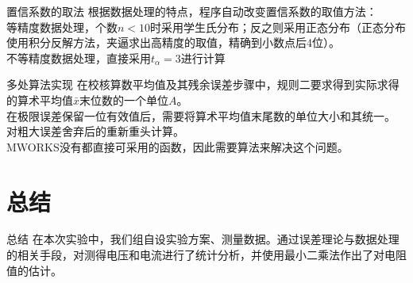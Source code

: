\documentclass{beamer}
\begin{document}
	\begin{frame}
		\begin{block}{置信系数的取法}
			根据数据处理的特点，程序自动改变置信系数的取值方法：\\
			等精度数据处理，个数$n<10$时采用学生氏分布；反之则采用正态分布（正态分布使用积分反解方法，夹逼求出高精度的取值，精确到小数点后4位）。\\
			不等精度数据处理，直接采用$t_\alpha=3$进行计算
		\end{block}
		\begin{block}{多处算法实现}
			在校核算数平均值及其残余误差步骤中，规则二要求得到实际求得的算术平均值$\bar{x}$末位数的一个单位$A$。\\
			在极限误差保留一位有效值后，需要将算术平均值末尾数的单位大小和其统一。\\
			对粗大误差舍弃后的重新重头计算。\\
			MWORKS没有都直接可采用的函数，因此需要算法来解决这个问题。\\
		\end{block}
	\end{frame}
\section{总结}
	\begin{frame}{总结}
		在本次实验中，我们组自设实验方案、测量数据。通过误差理论与数据处理的相关手段，对测得电压和电流进行了统计分析，并使用最小二乘法作出了对电阻值的估计。
	\end{frame}
\end{document}
